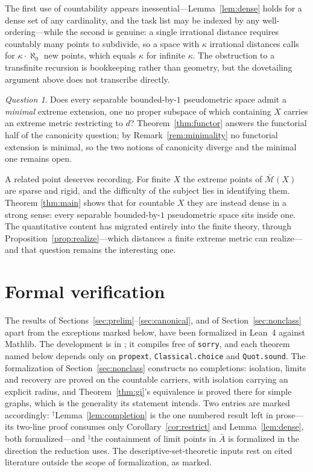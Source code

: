 \documentclass[11pt]{article}
\theoremstyle{definition}
\theoremstyle{remark}
\newtheorem{question}[theorem]{Question}
\newcommand{\bM}{\bar{\mathcal{M}}}
\begin{document}
The first use of countability appears inessential---Lemma~\ref{lem:dense} holds for a dense
set of any cardinality, and the task list may be indexed by any well-ordering---while the
second is genuine: a single irrational distance requires countably many points to
subdivide, so a space with $\kappa$ irrational distances calls for $\kappa\cdot\aleph_0$
new points, which equals $\kappa$ for infinite $\kappa$. The obstruction to a transfinite
recursion is bookkeeping rather than geometry, but the dovetailing argument above does not
transcribe directly.

\begin{question}\label{q:minimal}
Does every separable bounded-by-$1$ pseudometric space admit a \emph{minimal} extreme
extension, one no proper subspace of which containing $X$ carries an extreme metric
restricting to $d$? Theorem~\ref{thm:functor} answers the functorial half of the canonicity
question; by Remark~\ref{rem:minimality} no functorial extension is minimal, so the two
notions of canonicity diverge and the minimal one remains open.
\end{question}

A related point deserves recording. For finite $X$ the extreme points of $\bM(X)$ are
sparse and rigid, and the difficulty of the subject lies in identifying them. Theorem
\ref{thm:main} shows that for countable $X$ they are instead dense in a strong sense: every
separable bounded-by-$1$ pseudometric space sits inside one. The quantitative content has
migrated entirely into the finite theory, through
Proposition~\ref{prop:realize}---which distances a finite extreme metric can realize---and
that question remains the interesting one.

\section{Formal verification}
\label{sec:verify}

The results of Sections~\ref{sec:prelim}--\ref{sec:canonical}, and of
Section~\ref{sec:nonclass} apart from the exceptions marked below, have been formalized in
Lean~4 against Mathlib. The development is in \cite{Deposit}; it compiles free of
\texttt{sorry}, and each theorem named below depends only on \texttt{propext},
\texttt{Classical.choice} and \texttt{Quot.sound}. The formalization of
Section~\ref{sec:nonclass} constructs no completions: isolation, limits and recovery are
proved on the countable carriers, with isolation carrying an explicit radius, and
Theorem~\ref{thm:gi}'s equivalence is proved there for simple graphs, which is the
generality its statement intends. Two entries are marked accordingly:
$^{\dagger}$Lemma~\ref{lem:completion} is the one numbered result left in prose---its
two-line proof consumes only Corollary~\ref{cor:restrict} and Lemma~\ref{lem:dense}, both
formalized---and $^{\ddagger}$the containment of limit points in $\bar A$ is formalized in
the direction the reduction uses. The descriptive-set-theoretic inputs rest on cited
literature outside the scope of formalization, as marked.
\end{document}
